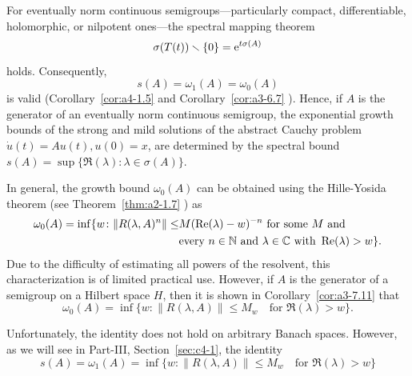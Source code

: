 \begin{remark}\label{rem:a4-1.7}
For eventually norm continuous semigroups---particularly compact, differentiable, holomorphic, or nilpotent ones---the spectral mapping theorem 
\begin{equation}\label{eq:a4-1.7}
\sigma(T(t)) \smallsetminus \{0\} = \mathrm{e}^{t \sigma(A)}
\end{equation}
holds. 
Consequently,
\begin{equation}\label{eq:a4-1.8}
s(A) = \omega_1(A) = \omega_{0}(A)
\end{equation}
is valid (Corollary~\ref{cor:a4-1.5} and Corollary~\ref{cor:a3-6.7} ).
Hence, if\/ $A$ is the generator of an eventually norm continuous semigroup, the exponential growth bounds of the strong and mild solutions of the abstract Cauchy problem $\dot{u}(t) = A u(t), u(0) = x$, are determined by the spectral bound
$s(A) = \sup\{\Re(\lambda)\colon\lambda \in \sigma(A)\}.$
\end{remark}
\begin{remark} In general, the growth bound $\omega_{0}(A)$ can be obtained using the Hille-Yosida theorem (see Theorem~\ref{thm:a2-1.7} ) as
\begin{equation}\label{eq:a4-1.9}
\begin{split}
\omega_{0}(A) = \inf \{ w\colon\|R(\lambda, A)^n\| \leq &M ( \Re(\lambda) - w)^{-n} \text{ for some } M \text{ and}\\
&\text{every } n \in \N \text{ and } \lambda \in \C \text{ with } \Re(\lambda) > w\}. 
\end{split}
\end{equation}
%
Due to the difficulty of estimating all powers of the resolvent, this characterization is of limited practical use. 
However, if\/ $A$ is the generator of a semigroup on a Hilbert space $H$, then it is shown in Corollary~\ref{cor:a3-7.11}  that
\begin{equation}\label{eq:a4-1.10}
 \omega_{0}(A) = \inf \{ w\colon\| R(\lambda, A) \| \leq M_w \quad \text{for } \Re(\lambda) > w \}.
\end{equation}
\end{remark}
Unfortunately, the identity  does not hold on arbitrary Banach spaces. 
However, as we will see in Part-III, Section~\ref{sec:c4-1},  the identity 
\begin{equation}\label{eq:a4-1.11}
 s(A)=\omega_1(A) = \inf \{ w\colon\| R(\lambda, A) \| \leq M_w \quad \text{for } \Re(\lambda) > w \}
\end{equation}

